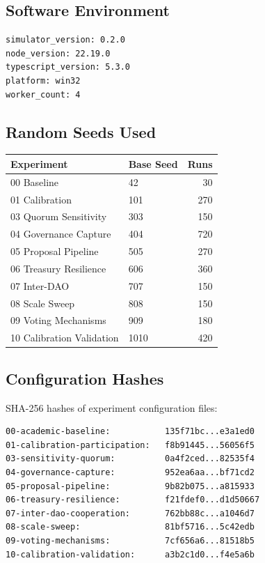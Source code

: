 
\subsection{Software Environment}

\begin{verbatim}
simulator_version: 0.2.0
node_version: 22.19.0
typescript_version: 5.3.0
platform: win32
worker_count: 4
\end{verbatim}

\subsection{Random Seeds Used}

\begin{tabular}{@{}llr@{}}
\toprule
Experiment & Base Seed & Runs \\
\midrule
00 Baseline & 42 & 30 \\
01 Calibration & 101 & 270 \\
03 Quorum Sensitivity & 303 & 150 \\
04 Governance Capture & 404 & 720 \\
05 Proposal Pipeline & 505 & 270 \\
06 Treasury Resilience & 606 & 360 \\
07 Inter-DAO & 707 & 150 \\
08 Scale Sweep & 808 & 150 \\
09 Voting Mechanisms & 909 & 180 \\
10 Calibration Validation & 1010 & 420 \\
\bottomrule
\end{tabular}

\subsection{Configuration Hashes}

SHA-256 hashes of experiment configuration files:
\begin{verbatim}
00-academic-baseline:           135f71bc...e3a1ed0
01-calibration-participation:   f8b91445...56056f5
03-sensitivity-quorum:          0a4f2ced...82535f4
04-governance-capture:          952ea6aa...bf71cd2
05-proposal-pipeline:           9b82b075...a815933
06-treasury-resilience:         f21fdef0...d1d50667
07-inter-dao-cooperation:       762bb88c...a1046d7
08-scale-sweep:                 81bf5716...5c42edb
09-voting-mechanisms:           7cf656a6...81518b5
10-calibration-validation:      a3b2c1d0...f4e5a6b
\end{verbatim}

